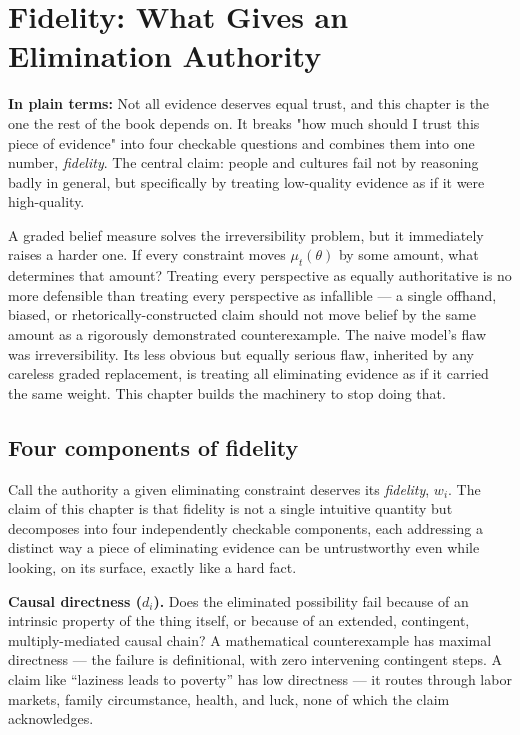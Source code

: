\chapter{Fidelity: What Gives an Elimination Authority}
\label{ch:fidelity}

\begin{plainlanguage}
\textbf{In plain terms:} Not all evidence deserves equal trust, and this chapter is the one the rest of the book depends on. It breaks "how much should I trust this piece of evidence" into four checkable questions and combines them into one number, \emph{fidelity}. The central claim: people and cultures fail not by reasoning badly in general, but specifically by treating low-quality evidence as if it were high-quality.
\end{plainlanguage}

A graded belief measure solves the irreversibility problem, but it immediately raises a harder one. If every constraint moves $\mu_t(\theta)$ by some amount, what determines that amount? Treating every perspective as equally authoritative is no more defensible than treating every perspective as infallible --- a single offhand, biased, or rhetorically-constructed claim should not move belief by the same amount as a rigorously demonstrated counterexample. The naive model's flaw was irreversibility. Its less obvious but equally serious flaw, inherited by any careless graded replacement, is treating all eliminating evidence as if it carried the same weight. This chapter builds the machinery to stop doing that.

\section{Four components of fidelity}

Call the authority a given eliminating constraint deserves its \emph{fidelity}, $w_i$. The claim of this chapter is that fidelity is not a single intuitive quantity but decomposes into four independently checkable components, each addressing a distinct way a piece of eliminating evidence can be untrustworthy even while looking, on its surface, exactly like a hard fact.

\textbf{Causal directness ($d_i$).} Does the eliminated possibility fail because of an intrinsic property of the thing itself, or because of an extended, contingent, multiply-mediated causal chain? A mathematical counterexample has maximal directness --- the failure is definitional, with zero intervening contingent steps. A claim like ``laziness leads to poverty'' has low directness --- it routes through labor markets, family circumstance, health, and luck, none of which the claim acknowledges.

